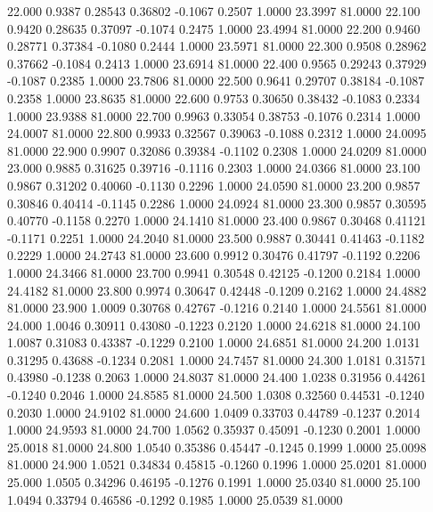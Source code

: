   22.000   0.9387   0.28543   0.36802  -0.1067   0.2507   1.0000  23.3997  81.0000
  22.100   0.9420   0.28635   0.37097  -0.1074   0.2475   1.0000  23.4994  81.0000
  22.200   0.9460   0.28771   0.37384  -0.1080   0.2444   1.0000  23.5971  81.0000
  22.300   0.9508   0.28962   0.37662  -0.1084   0.2413   1.0000  23.6914  81.0000
  22.400   0.9565   0.29243   0.37929  -0.1087   0.2385   1.0000  23.7806  81.0000
  22.500   0.9641   0.29707   0.38184  -0.1087   0.2358   1.0000  23.8635  81.0000
  22.600   0.9753   0.30650   0.38432  -0.1083   0.2334   1.0000  23.9388  81.0000
  22.700   0.9963   0.33054   0.38753  -0.1076   0.2314   1.0000  24.0007  81.0000
  22.800   0.9933   0.32567   0.39063  -0.1088   0.2312   1.0000  24.0095  81.0000
  22.900   0.9907   0.32086   0.39384  -0.1102   0.2308   1.0000  24.0209  81.0000
  23.000   0.9885   0.31625   0.39716  -0.1116   0.2303   1.0000  24.0366  81.0000
  23.100   0.9867   0.31202   0.40060  -0.1130   0.2296   1.0000  24.0590  81.0000
  23.200   0.9857   0.30846   0.40414  -0.1145   0.2286   1.0000  24.0924  81.0000
  23.300   0.9857   0.30595   0.40770  -0.1158   0.2270   1.0000  24.1410  81.0000
  23.400   0.9867   0.30468   0.41121  -0.1171   0.2251   1.0000  24.2040  81.0000
  23.500   0.9887   0.30441   0.41463  -0.1182   0.2229   1.0000  24.2743  81.0000
  23.600   0.9912   0.30476   0.41797  -0.1192   0.2206   1.0000  24.3466  81.0000
  23.700   0.9941   0.30548   0.42125  -0.1200   0.2184   1.0000  24.4182  81.0000
  23.800   0.9974   0.30647   0.42448  -0.1209   0.2162   1.0000  24.4882  81.0000
  23.900   1.0009   0.30768   0.42767  -0.1216   0.2140   1.0000  24.5561  81.0000
  24.000   1.0046   0.30911   0.43080  -0.1223   0.2120   1.0000  24.6218  81.0000
  24.100   1.0087   0.31083   0.43387  -0.1229   0.2100   1.0000  24.6851  81.0000
  24.200   1.0131   0.31295   0.43688  -0.1234   0.2081   1.0000  24.7457  81.0000
  24.300   1.0181   0.31571   0.43980  -0.1238   0.2063   1.0000  24.8037  81.0000
  24.400   1.0238   0.31956   0.44261  -0.1240   0.2046   1.0000  24.8585  81.0000
  24.500   1.0308   0.32560   0.44531  -0.1240   0.2030   1.0000  24.9102  81.0000
  24.600   1.0409   0.33703   0.44789  -0.1237   0.2014   1.0000  24.9593  81.0000
  24.700   1.0562   0.35937   0.45091  -0.1230   0.2001   1.0000  25.0018  81.0000
  24.800   1.0540   0.35386   0.45447  -0.1245   0.1999   1.0000  25.0098  81.0000
  24.900   1.0521   0.34834   0.45815  -0.1260   0.1996   1.0000  25.0201  81.0000
  25.000   1.0505   0.34296   0.46195  -0.1276   0.1991   1.0000  25.0340  81.0000
  25.100   1.0494   0.33794   0.46586  -0.1292   0.1985   1.0000  25.0539  81.0000
